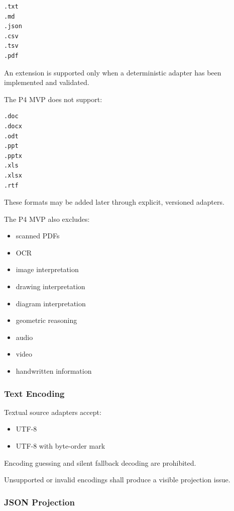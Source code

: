 \begin{verbatim}
.txt
.md
.json
.csv
.tsv
.pdf
\end{verbatim}

An extension is supported only when a deterministic adapter has been implemented and validated.

The P4 MVP does not support:

\begin{verbatim}
.doc
.docx
.odt
.ppt
.pptx
.xls
.xlsx
.rtf
\end{verbatim}

These formats may be added later through explicit, versioned adapters.

The P4 MVP also excludes:

\begin{itemize}
\tightlist
\item
  scanned PDFs
\item
  OCR
\item
  image interpretation
\item
  drawing interpretation
\item
  diagram interpretation
\item
  geometric reasoning
\item
  audio
\item
  video
\item
  handwritten information
\end{itemize}

\hypertarget{text-encoding}{%
\subsubsection{Text Encoding}\label{text-encoding}}

Textual source adapters accept:

\begin{itemize}
\tightlist
\item
  UTF-8
\item
  UTF-8 with byte-order mark
\end{itemize}

Encoding guessing and silent fallback decoding are prohibited.

Unsupported or invalid encodings shall produce a visible projection issue.

\hypertarget{json-projection}{%
\subsubsection{JSON Projection}\label{json-projection}}


